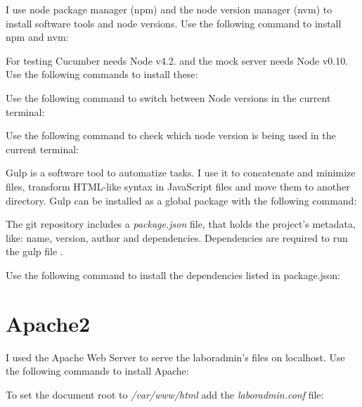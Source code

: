 I use node package manager (npm) and the node version manager (nvm) to install software tools and node versions. Use the following command to install npm and nvm:


For testing Cucumber needs Node v4.2. and the mock server needs Node v0.10. Use the following commands to install these:

	
Use the following command to switch between Node versions in the current terminal:


Use the following command to check which node version is being used in the current terminal:


\label{gulp}Gulp is a software tool to automatize tasks. I use it to concatenate and minimize files, transform HTML-like syntax in JavaScript files and move them to another directory. Gulp can be installed as a global package with the following command:


The git repository includes a \emph{package.json} file, that holds the project's metadata, like: name, version, author and dependencies. Dependencies are required to run the gulp file .

Use the following command to install the dependencies listed in package.json:


\section{Apache2}
I used the Apache Web Server to serve the laboradmin's files on localhost. Use the following commands to install Apache:

	
To set the document root to \emph{/var/www/html} add the \emph{laboradmin.conf} file:


